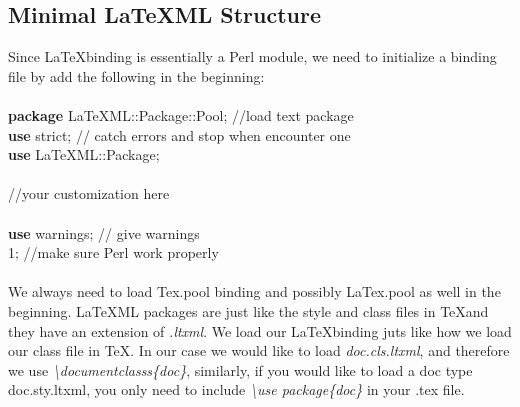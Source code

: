 \documentclass{book}
\begin{document}
\subsection{Minimal LaTeXML Structure}
Since \LaTeX binding is essentially a Perl module, we need to initialize a binding file by add the following in the beginning:\\ \\
\textbf{package} LaTeXML::Package::Pool; //load text package \\
\textbf{use} strict; // catch errors and stop when encounter one\\
\textbf{use} LaTeXML::Package;\\ \\
//your customization here \\ \\
\textbf{use} warnings; // give warnings\\
1; //make sure Perl work properly \\ \\
We always need to load Tex.pool binding and possibly LaTex.pool as well in the beginning. \LaTeX ML packages are just like the 
style and class files in \TeX  and they have an extension of \emph{.ltxml}. We load our \LaTeX binding juts like how we load our 
class file in \TeX . In our case we would like to load \emph{doc.cls.ltxml}, and therefore we use \emph{\textbackslash documentclasss\{doc\}},
similarly, if you would like to load a doc type doc.sty.ltxml, you only need to include \emph{\textbackslash use package\{doc\}} in your .tex 
file.
\end{document}
